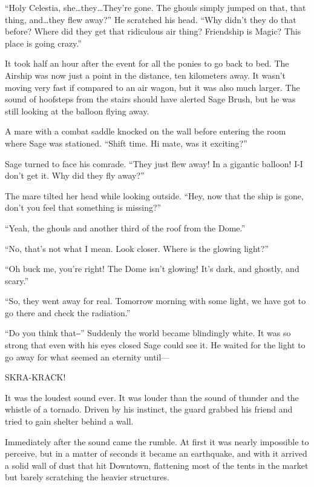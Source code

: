 ``Holy Celestia, she\dots they\dots They're gone. The ghouls simply jumped on that, that thing, and\dots they flew away?'' He scratched his head. ``Why didn't they do that before? Where did they get that ridiculous air thing? Friendship is Magic? This place is going crazy.''


\horizonline


It took half an hour after the event for all the ponies to go back to bed. The Airship was now just a point in the distance, ten kilometers away. It wasn't moving very fast if compared to an air wagon, but it was also much larger. The sound of hoofsteps from the stairs should have alerted Sage Brush, but he was still looking at the balloon flying away.

A mare with a combat saddle knocked on the wall before entering the room where Sage was stationed. ``Shift time. Hi mate, was it exciting?''

Sage turned to face his comrade. ``They just flew away! In a gigantic balloon! I-I don't get it. Why did they fly away?''

The mare tilted her head while looking outside. ``Hey, now that the ship is gone, don't you feel that something is missing?''

``Yeah, the ghouls and another third of the roof from the Dome.''

``No, that's not what I mean. Look closer. Where is the glowing light?''

``Oh buck me, you're right! The Dome isn't glowing! It's dark, and ghostly, and scary.''

``So, they went away for real. Tomorrow morning with some light, we have got to go there and check the radiation.''

``Do you think that‒'' Suddenly the world became blindingly white. It was so strong that even with his eyes closed Sage could see it. He waited for the light to go away for what seemed an eternity until---

SKRA-KRACK!

It was the loudest sound ever. It was louder than the sound of thunder and the whistle of a tornado. Driven by his instinct, the guard grabbed his friend and tried to gain shelter behind a wall.

Immediately after the sound came the rumble. At first it was nearly impossible to perceive, but in a matter of seconds it became an earthquake, and with it arrived a solid wall of dust that hit Downtown, flattening most of the tents in the market but barely scratching the heavier structures.


